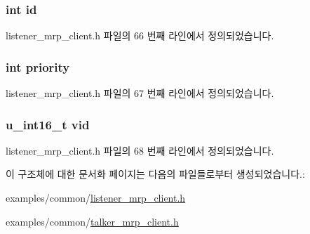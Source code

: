 \subsubsection[{\texorpdfstring{id}{id}}]{\setlength{\rightskip}{0pt plus 5cm}int id}\hypertarget{structmrp__domain__attr_a7441ef0865bcb3db9b8064dd7375c1ea}{}\label{structmrp__domain__attr_a7441ef0865bcb3db9b8064dd7375c1ea}


listener\+\_\+mrp\+\_\+client.\+h 파일의 66 번째 라인에서 정의되었습니다.

\subsubsection[{\texorpdfstring{priority}{priority}}]{\setlength{\rightskip}{0pt plus 5cm}int priority}\hypertarget{structmrp__domain__attr_acec9ce2df15222151ad66fcb1d74eb9f}{}\label{structmrp__domain__attr_acec9ce2df15222151ad66fcb1d74eb9f}


listener\+\_\+mrp\+\_\+client.\+h 파일의 67 번째 라인에서 정의되었습니다.

\subsubsection[{\texorpdfstring{vid}{vid}}]{\setlength{\rightskip}{0pt plus 5cm}u\+\_\+int16\+\_\+t vid}\hypertarget{structmrp__domain__attr_a066fae47f1854479570ecc0bf7e488c3}{}\label{structmrp__domain__attr_a066fae47f1854479570ecc0bf7e488c3}


listener\+\_\+mrp\+\_\+client.\+h 파일의 68 번째 라인에서 정의되었습니다.



이 구조체에 대한 문서화 페이지는 다음의 파일들로부터 생성되었습니다.\+:\begin{DoxyCompactItemize}
\item 
examples/common/\hyperlink{listener__mrp__client_8h}{listener\+\_\+mrp\+\_\+client.\+h}\item 
examples/common/\hyperlink{talker__mrp__client_8h}{talker\+\_\+mrp\+\_\+client.\+h}\end{DoxyCompactItemize}
